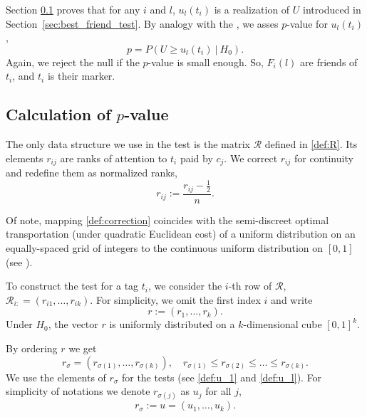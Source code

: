 \documentclass{llncs}
\begin{document}

Section \ref{sec:theory} proves that for any $i$ and $l$, $u_l(t_i)$ is a realization of $U$ introduced  in Section~\ref{sec:best_friend_test}.
By analogy with the , we asses $p$-value for $u_{l}(t_i)$,
\[
p = P\left(U \ge u_l(t_i)~|~H_0\right). 
\]
Again, we reject the null if the $p$-value is small enough. So, $F_{i}(l)$ are friends of $t_i$, and $t_i$ is their marker.


\subsection{Calculation of $p$-value}
\label{sec:theory}
The only data structure we use in the test is the matrix $\mathcal{R}$ defined in \eqref{def:R}.  
Its elements $r_{ij}$ are ranks of attention to $t_i$ paid by $c_j$.
We correct $r_{ij}$ for continuity and redefine them as normalized ranks,
\begin{equation}
\label{def:correction}
r_{ij} := \frac{r_{ij} - \frac{1}{2}}{n}.
\end{equation}

Of note, mapping \eqref{def:correction} coincides with the semi-discreet optimal transportation (under quadratic Euclidean cost) of a uniform distribution on an equally-spaced grid of integers to the continuous uniform distribution on $[0, 1]$ (see \cite{Solomon2018OptimalTO}).

To construct the test for a tag $t_i$, we consider the $i$-th row of $\mathcal{R}$, $\mathcal{R}_{i:} = (r_{i1}, \dots, r_{ik})$. For simplicity, we omit the first index $i$ and write
\[
r := (r_{1}, \dots, r_{k}).
\]
Under $H_0$, the vector $r$ is uniformly distributed on a $k$-dimensional cube $[0, 1]^{k}$.

By ordering $r$ we get
\[
r_{\sigma} = (r_{\sigma(1)}, \dots, r_{\sigma(k)}), 
\quad
r_{\sigma(1)} \leq r_{\sigma(2)} \leq \dots \leq r_{\sigma(k)}.
\]
We use the elements of $r_{\sigma}$ for the tests (see \eqref{def:u_1} and \eqref{def:u_l}). For simplicity of notations we denote $r_{\sigma(j)}$ as $u_j$ for all $j$,
\begin{equation}
\label{def:u}
    r_{\sigma} := u = (u_1, \dots, u_k).
\end{equation}
\end{document}
